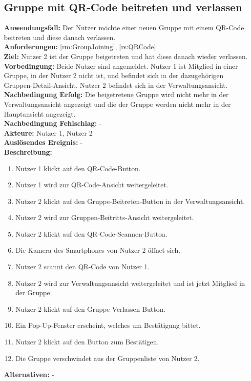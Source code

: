 \documentclass[parskip=full]{scrartcl}
\begin{document}
\subsection{Gruppe mit QR-Code beitreten und verlassen}
\textbf{Anwendungsfall:} Der Nutzer möchte einer neuen Gruppe mit einem QR-Code beitreten und diese danach verlassen.\\
\textbf{Anforderungen:} \ref{rm:GroupJoining}, \ref{rs:QRCode} \\
\textbf{Ziel:} Nutzer 2 ist der Gruppe beigetreten und hat diese danach wieder verlassen.\\
\textbf{Vorbedingung:} Beide Nutzer sind angemeldet. Nutzer 1 ist Mitglied in einer Gruppe, in der Nutzer 2 nicht ist, und befindet sich in der dazugehörigen Gruppen-Detail-Ansicht. Nutzer 2 befindet sich in der Verwaltungsansicht.\\
\textbf{Nachbedingung Erfolg:} Die beigetretene Gruppe wird nicht mehr in der Verwaltungsansicht angezeigt und die  der Gruppe werden nicht mehr in der Hauptansicht angezeigt.\\
\textbf{Nachbedingung Fehlschlag:} -\\
\textbf{Akteure:} Nutzer 1, Nutzer 2\\
\textbf{Auslösendes Ereignis:} -\\
\textbf{Beschreibung:}
\begin{enumerate}
    \item Nutzer 1 klickt auf den QR-Code-Button.
    \item Nutzer 1 wird zur QR-Code-Ansicht weitergeleitet.
    \item Nutzer 2 klickt auf den Gruppe-Beitreten-Button in der Verwaltungsansicht.
    \item Nutzer 2 wird zur Gruppen-Beitritts-Ansicht weitergeleitet.
    \item Nutzer 2 klickt auf den QR-Code-Scannen-Button.
    \item Die Kamera des Smartphones von Nutzer 2 öffnet sich.
    \item Nutzer 2 scannt den QR-Code von Nutzer 1.
    \item Nutzer 2 wird zur Verwaltungsansicht weitergeleitet und ist jetzt Mitglied in der Gruppe.
    \item Nutzer 2 klickt auf den Gruppe-Verlassen-Button.
    \item Ein Pop-Up-Fenster erscheint, welches um Bestätigung bittet.
    \item Nutzer 2 klickt auf den Button zum Bestätigen.
    \item Die Gruppe verschwindet aus der Gruppenliste von Nutzer 2.
\end{enumerate}
\textbf{Alternativen:} -
\newpage
\end{document}
